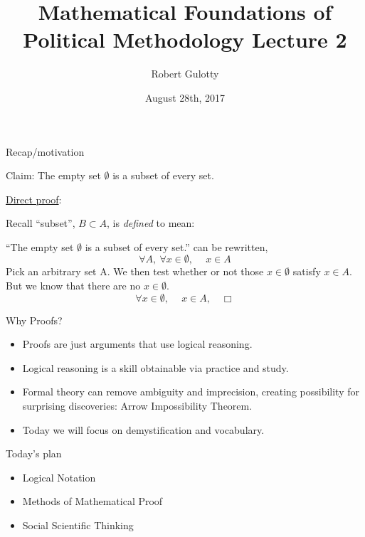\documentclass[aspectratio=169]{beamer}
\title[PLSC 43401] %
{Mathematical Foundations of Political Methodology Lecture 2}
\author{Robert Gulotty}
\institute[University of Chicago]{Department of Political Science \\  University of Chicago}
\date{August 28th, 2017}
\numberwithin{equation}{section}
\begin{document}
\begin{frame}
\titlepage
\end{frame}


\begin{frame}{Recap/motivation}

Claim:  The empty set $\emptyset$ is a subset of every set. \pause

 \begin{center}
 \underline{Direct proof}:\\\pause
 \end{center}
Recall ``subset'',  $B\subset A$, is \emph{defined} to mean:\\
  
 \begin{center}
\end{center}
\pause

``The empty set $\emptyset$ is a subset of every set.'' can be rewritten, 
$$\forall A,\ \forall x\in \emptyset,\ \quad  x\in A$$
\pause 
Pick an arbitrary set A.  We then test whether or not those $x\in \emptyset$ satisfy $x\in A$. But we know that there are no $x\in \emptyset$. \pause
$$\forall x\in \emptyset,\ \quad  x\in A, \quad \Box$$  

\end{frame}


\begin{frame}{Why Proofs?}

\begin{itemize}
\item Proofs are just arguments that use logical reasoning.\pause
\item Logical reasoning is a skill obtainable via practice and study.\pause
\item Formal theory can remove ambiguity and imprecision, creating possibility for surprising discoveries: Arrow Impossibility Theorem.\pause
\item Today we will focus on demystification and vocabulary.
\end{itemize}

\end{frame}





\begin{frame}{Today's plan}

\begin{itemize}
\item \textcolor{myblack}{Logical Notation}
\item \textcolor{myblack}{Methods of Mathematical Proof}
\item \textcolor{myblack}{Social Scientific Thinking}
\end{itemize}

\end{frame}
\end{document}
